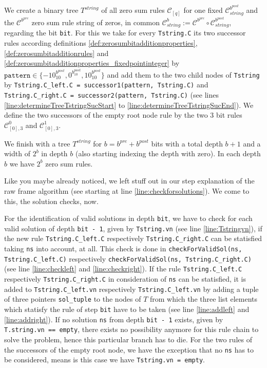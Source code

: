 \begin{step}
    We create a binary tree $T^{string}$ of all zero sum rules $\mathcal{C}_{[q]}$ for one fixed $\mathcal{C}^{b^{post}}_{string}$ and the $\mathcal{C}^{b^{pre}}$ zero sum rule string of zeros, in common $\mathcal{C}^{b}_{string} := \mathcal{C}^{b^{pre}} \circ \mathcal{C}^{b^{post}}_{string}$, regarding the bit \texttt{bit}. For this we take for every \texttt{Tstring.C} its two successor rules according definitions \ref{def:zerosumbitadditionproperties}, \ref{def:zerosumbitadditionrules} and \ref{def:zerosumbitadditionproperties_fixedpointinteger} by $\texttt{pattern} \in \{-10^{b^{post}}_{10}, 0^{b^{post}_{10}}, 10^{b^{post}}_{10} \}$ and add them to the two child nodes of \texttt{Tstring} by \texttt{Tstring.C\_left.C = successor1(pattern, Tstring.C)} and \texttt{Tstring.C\_right.C = successor2(pattern, Tstring.C)} (see lines \ref{line:determineTreeTstringSucStart} to \ref{line:determineTreeTstringSucEnd}). We define the two successors of the empty root node rule by the two $3$ bit rules $\mathcal{C}^{0}_{[0],3}$ and $\mathcal{C}^{1}_{[0],3}$.
\label{step:creationofzerosumsrulestree}
\end{step}

We finish with a tree $T^{string}$ for $b = b^{pre} + b^{post}$ bits with a total depth $b+1$ and a width of $2^{b}$ in depth $b$ (also starting indexing the depth with zero). In each depth $b$ we have $2^{b}$ zero sum rules.

Like you maybe already noticed, we left stuff out in our step explanation of the raw frame algorithm (see starting at line \ref{line:checkforsolutions}). We come to this, the solution checks, now. 

\begin{step}
    For the identification of valid solutions in depth \texttt{bit}, we have to check for each valid solution of depth \texttt{bit - 1}, given by \texttt{Tstring.vn} (see line \ref{line:Tstringvn}), if the new rule \texttt{Tstring.C\_left.C} respectively \texttt{Tstring.C\_right.C} can be statisfied taking \texttt{ns} into account, at all. This check is done in \texttt{checkForValidSol(ns, Tstring.C\_left.C)} respectively \texttt{checkForValidSol(ns, Tstring.C\_right.C)} (see line \ref{line:checkleft} and \ref{line:checkright}). If the rule \texttt{Tstring.C\_left.C} respectively \texttt{Tstring.C\_right.C} in consideration of \texttt{ns} can be statisfied, it is added to \texttt{Tstring.C\_left.vn} respectively \texttt{Tstring.C\_left.vn} by adding a tuple of three pointers \texttt{sol\_tuple} to the nodes of $T$ from which the three list elements which statisfy the rule of step \texttt{bit} have to be taken (see line \ref{line:addleft} and \ref{line:addright}). If no solution \texttt{ns} from depth \texttt{bit - 1} exists, given by \texttt{T.string.vn == empty}, there exists no possibility anymore for this rule chain to solve the problem, hence this particular branch has to die. For the two rules of the successors of the empty root node, we have the exception that no \texttt{ns} has to be considered, means is this case we have \texttt{Tstring.vn = empty}.
\label{step:solutionchecks}
\end{step}

